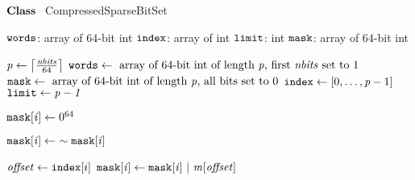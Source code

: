     \STATE $\textbf{Class~}$ CompressedSparseBitSet
    \item[]
      \STATE $\texttt{words}$: array of $64$-bit int  \label{line:sbsfield:start}
      \STATE $\texttt{index}$: array of int 
      \STATE $\texttt{limit}$: int 
      \STATE $\texttt{mask}$: array of $64$-bit int  \label{line:sbsfield:end}

    \item[]
     \label{line:initsbs:start}
      \STATE $\mathit{p} \gets \left\lceil\frac{\mathit{nbits}}{64}\right\rceil$
      \STATE $\texttt{words} \gets \text{~array of $64$-bit int of length~} \mathit{p} \text{, first~} 
      \mathit{nbits} \text{~set to 1}$
      \STATE $\texttt{mask} \gets \text{~array of $64$-bit int of length~} \mathit{p} \text{, all bits set to~}0$
      \STATE $\texttt{index} \gets [0, \ldots, \mathit{p} - 1]$
      \STATE $\texttt{limit} \gets \mathit{p-1}$ \label{line:initsbs:end}
      \Endfunc

    \item[]
       \label{line:isEmpty:1}
       \label{line:isEmpty:2}
      \Endfunc
    \item[]
       \label{line:clearMask:1}
       \label{line:clearMask:2}
        \STATE $\texttt{mask}[\mathit{i}] \gets 0^{64}$ \label{line:clearMask:4}
      \EndFor
      \Endfunc

    \item[]
       \label{line:reverse:1}
       \label{line:reverse:2}
      \STATE $\texttt{mask}[\localvar{i}] \gets \ \sim\texttt{mask}[\localvar{i}]$  \label{line:reverse:4}
      \EndFor
      \Endfunc

    \item[]
       \label{line:addToMask:1}
       \label{line:addToMask:2}
      \STATE $\mathit{offset} \gets \texttt{index}[i]$ \label{line:addToMask:3}
      \STATE $\texttt{mask}[\localvar{i}] \gets \texttt{mask}[\localvar{i}] \ | \ 
      \localvar{m}[\localvar{offset}]$  \label{line:addToMask:4}
      \EndFor
      \Endfunc

